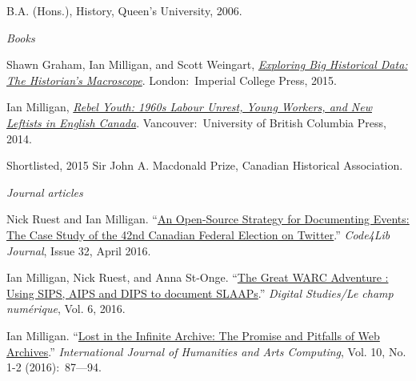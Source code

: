 \documentclass[11pt,article,oneside]{memoir}
\begin{document}
\ind B.A. (Hons.), History, Queen's University, 2006.

\bigskip
 
\medskip
\noindent\emph{Books \vspace{0.01in}}

\ind  Shawn Graham, Ian Milligan, and Scott Weingart, \emph{\href{http://www.worldscientific.com/worldscibooks/10.1142/p981}{Exploring Big Historical Data: The Historian's Macroscope}}. London:~Imperial College Press, 2015. \vspace{0.05in}

\ind  Ian Milligan, \emph{\href{http://www.ubcpress.ca/search/title_book.asp?BookID=299174315}{Rebel Youth: 1960s Labour Unrest, Young Workers, and New Leftists in English Canada}}. Vancouver:~University of British Columbia Press, 2014.\vspace{0.05in}

\ind \hspace{0.35in} \footnotesize Shortlisted, 2015 Sir John A. Macdonald Prize, Canadian Historical Association.

\vspace{-0.075in}

\normalsize

\bigskip
\noindent\emph{Journal articles \vspace{0.05in}}
 

\ind Nick Ruest and Ian Milligan. ``\href{http://journal.code4lib.org/articles/11358}{An Open-Source Strategy for Documenting Events: The Case Study of the 42nd Canadian Federal Election on Twitter}.'' \emph{Code4Lib Journal}, Issue 32, April 2016.

\ind Ian Milligan, Nick Ruest, and Anna St-Onge. ``\href{http://www.digitalstudies.org/ojs/index.php/digital_studies/article/view/325/412}{The Great WARC Adventure : Using SIPS, AIPS and DIPS to document SLAAPs}.'' \emph{Digital Studies/Le champ num\'erique}, Vol. 6, 2016.

\ind Ian Milligan. ``\href{http://www.euppublishing.com/doi/abs/10.3366/ijhac.2016.0161}{Lost in the Infinite Archive: The Promise and Pitfalls of Web Archives}.'' \emph{International Journal of Humanities and Arts Computing}, Vol. 10, No. 1-2 (2016):~87---94.
\end{document}
